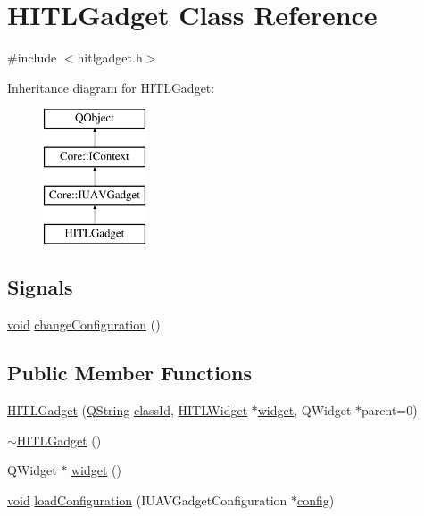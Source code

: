 \hypertarget{class_h_i_t_l_gadget}{\section{H\-I\-T\-L\-Gadget Class Reference}
\label{class_h_i_t_l_gadget}
}


{\ttfamily \#include $<$hitlgadget.\-h$>$}

Inheritance diagram for H\-I\-T\-L\-Gadget\-:\begin{figure}[H]
\begin{center}
\leavevmode
\includegraphics[height=4.000000cm]{class_h_i_t_l_gadget}
\end{center}
\end{figure}
\subsection*{Signals}
\begin{DoxyCompactItemize}
\item 
\hyperlink{group___u_a_v_objects_plugin_ga444cf2ff3f0ecbe028adce838d373f5c}{void} \hyperlink{group___h_i_t_l_plugin_ga13e1705f62c6f94853cd64d477b213ef}{change\-Configuration} ()
\end{DoxyCompactItemize}
\subsection*{Public Member Functions}
\begin{DoxyCompactItemize}
\item 
\hyperlink{group___h_i_t_l_plugin_ga2d1233acc508f6fcd25061c0584d1bab}{H\-I\-T\-L\-Gadget} (\hyperlink{group___u_a_v_objects_plugin_gab9d252f49c333c94a72f97ce3105a32d}{Q\-String} \hyperlink{group___core_plugin_ga3878fde66a57220608960bcc3fbeef2c}{class\-Id}, \hyperlink{class_h_i_t_l_widget}{H\-I\-T\-L\-Widget} $\ast$\hyperlink{group___h_i_t_l_plugin_ga98f16ca8c766c1cd037af671c7f843be}{widget}, Q\-Widget $\ast$parent=0)
\item 
\hyperlink{group___h_i_t_l_plugin_ga92376558188a3a1fdff609f2641758e7}{$\sim$\-H\-I\-T\-L\-Gadget} ()
\item 
Q\-Widget $\ast$ \hyperlink{group___h_i_t_l_plugin_ga98f16ca8c766c1cd037af671c7f843be}{widget} ()
\item 
\hyperlink{group___u_a_v_objects_plugin_ga444cf2ff3f0ecbe028adce838d373f5c}{void} \hyperlink{group___h_i_t_l_plugin_gad490d49033c38f3e197628890c342634}{load\-Configuration} (I\-U\-A\-V\-Gadget\-Configuration $\ast$\hyperlink{deflate_8c_a4473b5227787415097004fd39f55185e}{config})
\end{DoxyCompactItemize}

